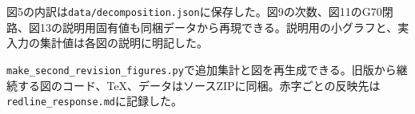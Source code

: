 {\small
図5の内訳は\texttt{data/decomposition.json}に保存した。図9の次数、図11のG70閉路、図13の説明用固有値も同梱データから再現できる。説明用の小グラフと、実入力の集計値は各図の説明に明記した。

\texttt{make\_second\_revision\_figures.py}で追加集計と図を再生成できる。旧版から継続する図のコード、TeX、データはソースZIPに同梱。赤字ごとの反映先は\texttt{redline\_response.md}に記録した。
}

